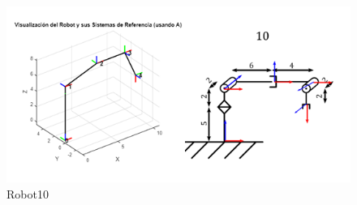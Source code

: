 \begin{figure} [h]
	\centering
	\includegraphics[width=0.9\linewidth]{"../Ejercicios DH/img/robot10"}
	\caption{Robot10}
	\label{fig:robot10}
\end{figure}
